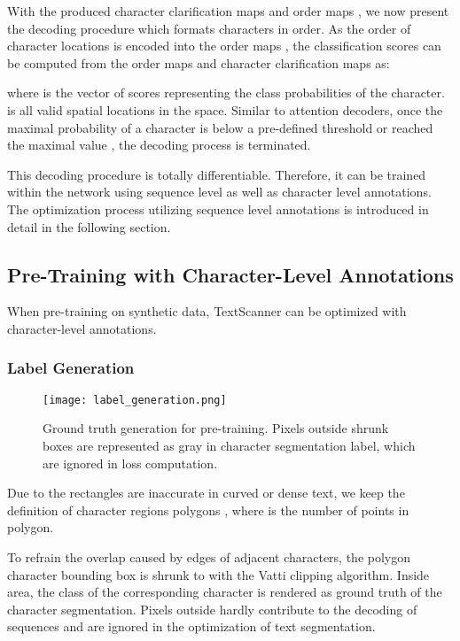 \documentclass[letterpaper]{article} \usepackage{aaai20}  \usepackage{times}  \usepackage{helvet} \usepackage{courier}  \usepackage[hyphens]{url}  \usepackage{graphicx} \urlstyle{rm} \def\UrlFont{\rm}  \usepackage{graphicx}  \frenchspacing  \setlength{\pdfpagewidth}{8.5in}  \setlength{\pdfpageheight}{11in}
\begin{document}
With the produced character clarification maps  and order maps , we now present the decoding procedure which formats characters in order. As the order of character locations is encoded into the order maps , the classification scores can be computed from the order maps and character clarification maps as:

where  is the vector of scores representing the class probabilities of the  character.  is all valid spatial locations in the  space. Similar to attention decoders, once the maximal probability of a character is below a pre-defined threshold  or  reached the maximal value , the decoding process is terminated.


This decoding procedure is totally differentiable. Therefore, it can be trained within the network using sequence level as well as character level annotations. The optimization process utilizing sequence level annotations is introduced in detail in the following section.


\subsection{Pre-Training with Character-Level Annotations}
When pre-training on synthetic data, TextScanner can be optimized with character-level annotations.

\subsubsection{Label Generation}

\begin{figure}[t]
    \centering
    \texttt{[image: label\_generation.png]}
    \caption{Ground truth generation for pre-training. Pixels outside shrunk boxes  are represented as gray in character segmentation label, which are ignored in loss computation.}
    \label{fig:labelgeneration}
\end{figure}

Due to the rectangles are inaccurate 
in curved or dense text, we keep the definition of character regions polygons
, where  is the number of points in polygon.

To refrain the overlap caused by edges of adjacent characters, the polygon character bounding box  is shrunk to  with the Vatti clipping algorithm\cite{vati}. Inside  area, the class of the corresponding character is rendered as ground truth of the character segmentation. Pixels outside  hardly contribute to the decoding of sequences and are ignored in the optimization of text segmentation.
\end{document}
